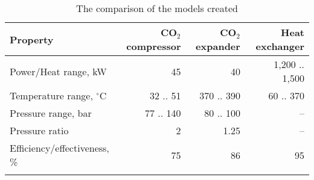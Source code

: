 \begin{table}
\label{tab:DiscussionComparison}
\caption{The comparison of the models created}
\begin{center}
\begin{tabulary}{0.9\textwidth}{LRRR}
\toprule
Property    	                &	CO$_2$ compressor   & CO$_2$	expander    & Heat exchanger    \\
\midrule
Power/Heat range, kW            &       45              &       40              &   1,200 .. 1,500  \\
Temperature range, $^\circ$C    &    32 .. 51           &      370 .. 390       &   60 .. 370       \\
Pressure range, bar             &   77 .. 140           &     80 .. 100         &      --           \\
Pressure ratio                  &   2                   &        1.25           &      --           \\
Efficiency/effectiveness, \%    &      75               &         86            &       95          \\
                                &                       &                       &                   \\

\bottomrule
\end{tabulary}
\end{center}
\end{table}